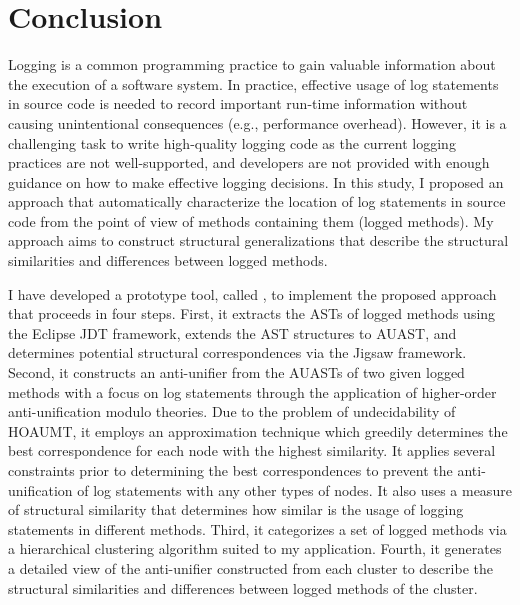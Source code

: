 
\chapter{Conclusion}  \label{conc}

Logging is a common programming practice to gain valuable information about the execution of a software system. In practice, effective usage of log statements in source code is needed to record important run-time information without causing unintentional consequences (e.g., performance overhead). However, it is a challenging task to write high-quality logging code as the current logging practices are not well-supported, and developers are not provided with enough guidance on how to make effective logging decisions. In this study, I proposed an approach that automatically characterize the location of log statements in source code from the point of view of methods containing them (logged methods). My approach aims to construct structural generalizations that describe the structural similarities and differences between logged methods.


I have developed a prototype tool, called , to implement the proposed approach that proceeds in four steps. First, it extracts the ASTs of logged methods using the Eclipse JDT framework, extends the AST structures to AUAST, and determines potential structural correspondences via the Jigsaw framework. Second, it constructs an anti-unifier from the AUASTs of two given logged methods with a focus on log statements through the application of higher-order anti-unification modulo theories. Due to the problem of undecidability of HOAUMT, it employs an approximation technique which greedily determines the best correspondence for each node with the highest similarity. It applies several constraints prior to determining the best correspondences to prevent the anti-unification of log statements with any other types of nodes. It also uses a measure of structural similarity that determines how similar is the usage of logging statements in different methods. Third, it categorizes a set of logged methods via a hierarchical clustering algorithm suited to my application. Fourth, it generates a detailed view of the anti-unifier constructed from each cluster to describe the structural similarities and differences between logged methods of the cluster.

